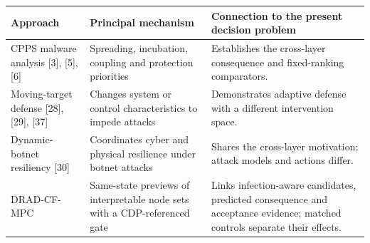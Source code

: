 \documentclass[10pt]{article}
\makeatletter
\newenvironment{exporttable}{\par\noindent\begin{minipage}{\linewidth}\def\@captype{table}}{\end{minipage}\par}
\makeatother
\begin{document}
\renewcommand{\thetable}{\Roman{table}}
\setcounter{table}{0}
\begin{exporttable}
\centering\small
\caption{Decision scope of representative approaches and the present framework. The rows compare mechanisms, not performance under a common benchmark.}
\label{tab:related_position}
\begin{tabularx}{\textwidth}{p{}p{}X}
\toprule
Approach & Principal mechanism & Connection to the present decision problem\\
\midrule
CPPS malware analysis [3], [5], [6] & Spreading, incubation, coupling and protection priorities & Establishes the cross-layer consequence and fixed-ranking comparators.\\
Moving-target defense [28], [29], [37] & Changes system or control characteristics to impede attacks & Demonstrates adaptive defense with a different intervention space.\\
Dynamic-botnet resiliency [30] & Coordinates cyber and physical resilience under botnet attacks & Shares the cross-layer motivation; attack models and actions differ.\\
DRAD-CF-MPC & Same-state previews of interpretable node sets with a CDP-referenced gate & Links infection-aware candidates, predicted consequence and acceptance evidence; matched controls separate their effects.\\
\bottomrule
\end{tabularx}
\end{exporttable}
\clearpage
\setcounter{table}{1}
\end{document}
